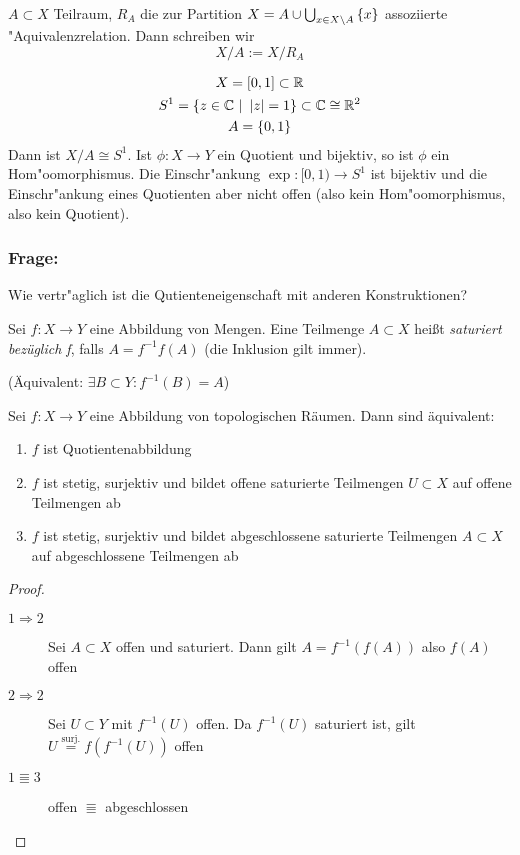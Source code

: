 \documentclass{skript}
\begin{document}
\begin{dfn}
    $A\subset X$ Teilraum, $R_A$ die zur Partition $X=A\cup \bigcup_{x\in
    X\setminus A} \mdef{x}$ assoziierte "Aquivalenzrelation. Dann schreiben wir
    \[
    X/A := X/R_A
    \]
    \begin{bsp}
        \begin{gather}
            X = [0,1]\subset \R \\
            S^1 = \mdef[z\in\C]{\left|z\right|=1}\subset \C \cong \R^2 \\
            A = \mdef{0,1}
        \end{gather}
        Dann ist $X/A \cong S^1$. Ist $\phi:X\to Y$ ein Quotient und bijektiv,
        so ist $\phi$ ein Hom"oomorphismus. Die Einschr"ankung $\exp : [0,1)
        \to S^1$ ist bijektiv und die Einschr"ankung eines Quotienten aber
        nicht offen (also kein Hom"oomorphismus, also kein Quotient).

        \subsubsection*{Frage:} Wie vertr"aglich ist die Qutienteneigenschaft
        mit anderen Konstruktionen?
    \end{bsp}
\end{dfn}

\begin{dfn}
    Sei  $f:X\to Y$ eine Abbildung von Mengen. Eine Teilmenge $A\subset X$ heißt
    \emph{saturiert bezüglich f}, falls $A=f^{-1}f(A)$ (die Inklusion gilt
    immer).

    (Äquivalent: $\exists B\subset Y: f^{-1}(B) = A$)
\end{dfn}

\begin{stz}
    Sei $f:X\to Y$ eine Abbildung von topologischen Räumen. Dann sind
    äquivalent:
    \begin{enumerate}
        \item $f$ ist Quotientenabbildung
        \item $f$ ist stetig, surjektiv und bildet offene saturierte Teilmengen
            $U\subset X$ auf offene Teilmengen ab
        \item $f$ ist stetig, surjektiv und bildet abgeschlossene saturierte
            Teilmengen $A\subset X$ auf abgeschlossene Teilmengen ab
    \end{enumerate}
    \begin{proof}
        \begin{description}
            \item[$1 \Rightarrow 2$] Sei $A\subset X$ offen und saturiert. Dann
                gilt $A = f^{-1}(f(A))$ also $f(A)$ offen
            \item[$2 \Rightarrow 2$] Sei $U\subset Y$ mit $f^{-1}(U)$ offen. Da
                $f^{-1}(U)$ saturiert ist, gilt $U \overset{\mathrm{surj.}}{=}
                f(f^{-1}(U))$ offen
            \item[$1 \Equiv 3$] offen $\Equiv$ abgeschlossen
        \end{description}
    \end{proof}
\end{stz}
\end{document}
